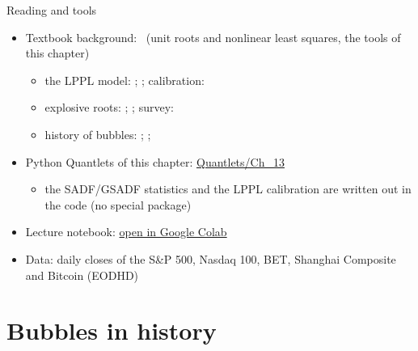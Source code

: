 \begin{frame}{Reading and tools}
\itemsize{\small}
\begin{itemize}
    \item Textbook background: \ (unit roots and nonlinear least squares, the tools of this chapter)
    \begin{itemize}
        \item the LPPL model: ; ; calibration: 
        \item explosive roots: ; ; survey: 
        \item history of bubbles: ; ; 
    \end{itemize}
    \item Python Quantlets of this chapter: \href{https://github.com/danpele/Time-Series-Analysis/tree/main/Quantlets/Ch_13}{Quantlets/Ch\_13}
    \begin{itemize}
        \item the SADF/GSADF statistics and the LPPL calibration are written out in the code (no special package)
    \end{itemize}
    \item Lecture notebook: \href{\colaburl{notebooks/EN/chapter13_lecture_notebook.ipynb}}{open in Google Colab}
    \item Data: daily closes of the S\&P 500, Nasdaq 100, BET, Shanghai Composite and Bitcoin (EODHD)
\end{itemize}
\end{frame}


\section{Bubbles in history}

